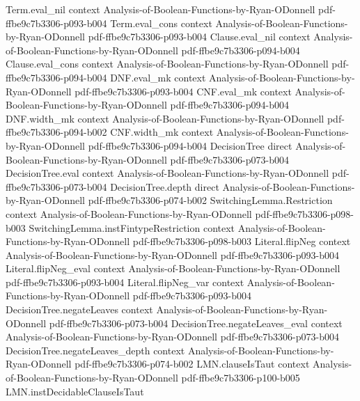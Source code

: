 \begin{lemma}
  {Term.eval_nil}
  {context}
  {Analysis-of-Boolean-Functions-by-Ryan-ODonnell}
  {pdf-ffbe9c7b3306-p093-b004}
\proofstep
  {Term.eval_cons}
  {context}
  {Analysis-of-Boolean-Functions-by-Ryan-ODonnell}
  {pdf-ffbe9c7b3306-p093-b004}
\proofstep
  {Clause.eval_nil}
  {context}
  {Analysis-of-Boolean-Functions-by-Ryan-ODonnell}
  {pdf-ffbe9c7b3306-p094-b004}
\proofstep
  {Clause.eval_cons}
  {context}
  {Analysis-of-Boolean-Functions-by-Ryan-ODonnell}
  {pdf-ffbe9c7b3306-p094-b004}
\proofstep
  {DNF.eval_mk}
  {context}
  {Analysis-of-Boolean-Functions-by-Ryan-ODonnell}
  {pdf-ffbe9c7b3306-p093-b004}
\proofstep
  {CNF.eval_mk}
  {context}
  {Analysis-of-Boolean-Functions-by-Ryan-ODonnell}
  {pdf-ffbe9c7b3306-p094-b004}
\proofstep
  {DNF.width_mk}
  {context}
  {Analysis-of-Boolean-Functions-by-Ryan-ODonnell}
  {pdf-ffbe9c7b3306-p094-b002}
\proofstep
  {CNF.width_mk}
  {context}
  {Analysis-of-Boolean-Functions-by-Ryan-ODonnell}
  {pdf-ffbe9c7b3306-p094-b004}
\proofstep
  {DecisionTree}
  {direct}
  {Analysis-of-Boolean-Functions-by-Ryan-ODonnell}
  {pdf-ffbe9c7b3306-p073-b004}
\proofstep
  {DecisionTree.eval}
  {context}
  {Analysis-of-Boolean-Functions-by-Ryan-ODonnell}
  {pdf-ffbe9c7b3306-p073-b004}
\proofstep
  {DecisionTree.depth}
  {direct}
  {Analysis-of-Boolean-Functions-by-Ryan-ODonnell}
  {pdf-ffbe9c7b3306-p074-b002}
\proofstep
  {SwitchingLemma.Restriction}
  {context}
  {Analysis-of-Boolean-Functions-by-Ryan-ODonnell}
  {pdf-ffbe9c7b3306-p098-b003}
\proofstep
  {SwitchingLemma.instFintypeRestriction}
  {context}
  {Analysis-of-Boolean-Functions-by-Ryan-ODonnell}
  {pdf-ffbe9c7b3306-p098-b003}
\proofstep
  {Literal.flipNeg}
  {context}
  {Analysis-of-Boolean-Functions-by-Ryan-ODonnell}
  {pdf-ffbe9c7b3306-p093-b004}
\proofstep
  {Literal.flipNeg_eval}
  {context}
  {Analysis-of-Boolean-Functions-by-Ryan-ODonnell}
  {pdf-ffbe9c7b3306-p093-b004}
\proofstep
  {Literal.flipNeg_var}
  {context}
  {Analysis-of-Boolean-Functions-by-Ryan-ODonnell}
  {pdf-ffbe9c7b3306-p093-b004}
\proofstep
  {DecisionTree.negateLeaves}
  {context}
  {Analysis-of-Boolean-Functions-by-Ryan-ODonnell}
  {pdf-ffbe9c7b3306-p073-b004}
\proofstep
  {DecisionTree.negateLeaves_eval}
  {context}
  {Analysis-of-Boolean-Functions-by-Ryan-ODonnell}
  {pdf-ffbe9c7b3306-p073-b004}
\proofstep
  {DecisionTree.negateLeaves_depth}
  {context}
  {Analysis-of-Boolean-Functions-by-Ryan-ODonnell}
  {pdf-ffbe9c7b3306-p074-b002}
\proofstep
  {LMN.clauseIsTaut}
  {context}
  {Analysis-of-Boolean-Functions-by-Ryan-ODonnell}
  {pdf-ffbe9c7b3306-p100-b005}
\proofstep
  {LMN.instDecidableClauseIsTaut}

\end{lemma}

